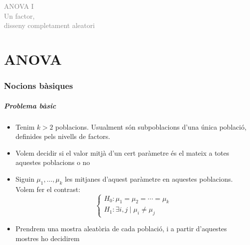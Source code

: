 \documentclass[12pt,t]{beamer}
\title[\red{Matemàtiques III}]{}
\author[]{}
\date{}
\newcommand{\gray}[1]{\textcolor{gray}{#1}}
\theoremstyle{plain}
\theoremstyle{definition}
\begin{document}
\beamertemplatedotitem

\lstset{breaklines=true}
\lstset{basicstyle=\ttfamily}


\begin{frame}
\vfill
\begin{center}
\gray{\LARGE ANOVA I\\
\bigskip
Un factor,\\ \medskip disseny completament aleatori}
\end{center}
\vfill
\end{frame}




 \part{ANOVA}

\section{Nocions bàsiques}
\begin{frame}
\frametitle{Problema bàsic}
\begin{itemize}
\item Tenim $k>2$ poblacions. Usualment són subpoblacions d'una única població, definides pels nivells de factors.
\medskip

\item Volem decidir si el valor mitjà d'un cert paràmetre és el mateix a totes aquestes poblacions o no
\medskip

\item Siguin $\mu_1,\ldots,\mu_k$ les mitjanes d'aquest paràmetre en aquestes poblacions. Volem fer el contrast:
$$
\left\{
\begin{array}{l}
H_0 : \mu_1 =\mu_2 =\cdots =\mu_k \\
H_1 : \exists i,j \mid  \mu_i \not=\mu_j
\end{array}
\right.
$$

\item Prendrem una mostra aleatòria de cada població, i a partir d'aquestes mostres ho decidirem
\end{itemize}



\end{frame}
\end{document}
